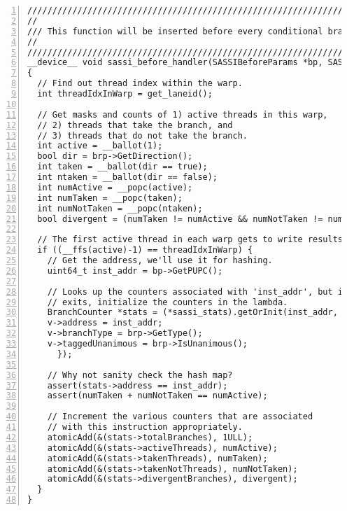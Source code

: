 \begin{figure*}[h!]
\begin{lstlisting}[numbers=left,numbersep=4pt]
///////////////////////////////////////////////////////////////////////////////////
//
/// This function will be inserted before every conditional branch instruction.
//
///////////////////////////////////////////////////////////////////////////////////
__device__ void sassi_before_handler(SASSIBeforeParams *bp, SASSICondBranchParams *brp) 
{
  // Find out thread index within the warp.
  int threadIdxInWarp = get_laneid();

  // Get masks and counts of 1) active threads in this warp,
  // 2) threads that take the branch, and
  // 3) threads that do not take the branch.
  int active = __ballot(1);
  bool dir = brp->GetDirection();
  int taken = __ballot(dir == true);
  int ntaken = __ballot(dir == false);
  int numActive = __popc(active);
  int numTaken = __popc(taken);
  int numNotTaken = __popc(ntaken);
  bool divergent = (numTaken != numActive && numNotTaken != numActive);

  // The first active thread in each warp gets to write results.
  if ((__ffs(active)-1) == threadIdxInWarp) {
    // Get the address, we'll use it for hashing.
    uint64_t inst_addr = bp->GetPUPC();
    
    // Looks up the counters associated with 'inst_addr', but if no such entry
    // exits, initialize the counters in the lambda.
    BranchCounter *stats = (*sassi_stats).getOrInit(inst_addr, [inst_addr,brp](BranchCounter* v) {
	v->address = inst_addr;
	v->branchType = brp->GetType();
	v->taggedUnanimous = brp->IsUnanimous();
      });

    // Why not sanity check the hash map?
    assert(stats->address == inst_addr);
    assert(numTaken + numNotTaken == numActive);

    // Increment the various counters that are associated
    // with this instruction appropriately.
    atomicAdd(&(stats->totalBranches), 1ULL);
    atomicAdd(&(stats->activeThreads), numActive);
    atomicAdd(&(stats->takenThreads), numTaken);
    atomicAdd(&(stats->takenNotThreads), numNotTaken);
    atomicAdd(&(stats->divergentBranches), divergent);
  }
}
\end{lstlisting}
\caption{Instrumentation handler portion of the conditional branch
  behavior profiling library.  See the library's source code for the
  full example.}
\label{fig:handler-example2}
\end{figure*}

